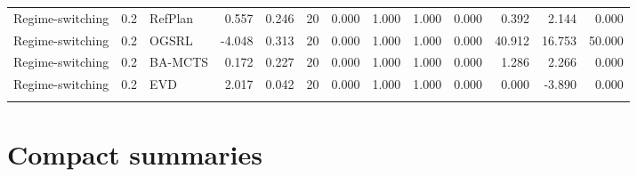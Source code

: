 \documentclass[10pt]{article}
\begin{document}
\begin{landscape}
\begin{center}
\begin{longtable}{@{}lllr@{}r@{}r@{}rrrrrrr@{}}
\addlinespace[1.5pt]
Regime-switching & 0.2 & RefPlan & 0.557 & 0.246 & 20 & 0.000 & 1.000 & 1.000 & 0.000 & 0.392 & 2.144 & 0.000 \\
Regime-switching & 0.2 & OGSRL & -4.048 & 0.313 & 20 & 0.000 & 1.000 & 1.000 & 0.000 & 40.912 & 16.753 & 50.000 \\
Regime-switching & 0.2 & BA-MCTS & 0.172 & 0.227 & 20 & 0.000 & 1.000 & 1.000 & 0.000 & 1.286 & 2.266 & 0.000 \\
Regime-switching & 0.2 & EVD & 2.017 & 0.042 & 20 & 0.000 & 1.000 & 1.000 & 0.000 & 0.000 & -3.890 & 0.000 \\
\addlinespace[1.5pt]
\end{longtable}
\end{center}
\end{landscape}
\section{Compact summaries}
\end{document}
